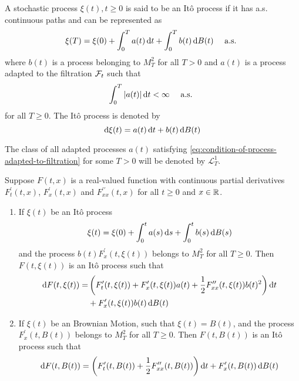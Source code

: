 \begin{definition}
	A stochastic process $\xi(t),t\geq 0$ is said to be an Itô process if it has a.s. continuous paths and can be represented as
	\begin{equation}
		\xi(T)=\xi(0)+\int_{0}^{T}a(t)\mathop{}\!\mathrm{d} t+\int_{0}^{T}b(t)\mathop{}\!\mathrm{d} B(t)\quad\text { a.s. }
	\end{equation}
	where $b(t)$ is a process belonging to $M_{T}^{2}$ for all $T>0$ and $a(t)$ is a process adapted to the filtration ${\mathcal F}_{t}$ such that
	\begin{equation}
		\int_{0}^{T}|a(t)|\mathop{}\!\mathrm{d} t<\infty\quad\text { a.s. } \label{eq:condition-of-process-adapted-to-filtration}
	\end{equation}
	for all $T\geq 0$.
	The Itô process is denoted by
	\begin{equation}
		\mathop{}\!\mathrm{d}\xi(t)=a(t)\mathop{}\!\mathrm{d} t+b(t)\mathop{}\!\mathrm{d} B(t)
	\end{equation}
\end{definition}

\begin{remark}
	The class of all adapted processes $a(t)$ satisfying \ref{eq:condition-of-process-adapted-to-filtration} for some $T>0$ will be denoted by $\mathcal{L}_{T}^{1}$.
\end{remark}

\begin{theorem}[It\^o Formula]
	Suppose $F\left(t,x\right)$ is a real-valued function with continuous partial derivatives $F_{t}^{\prime}\left(t,x\right)$, $F_{x}^{\prime}\left(t,x\right)$ and $F_{xx}^{\prime\prime}\left(t,x\right)$ for all $t\geq 0$ and $x\in{\mathbb R}$.
	\begin{enumerate}
		\item If $\xi(t)$ be an It\^o process
		      \begin{equation*}
			      \xi(t)=\xi(0)+\int_{0}^{t}a(s)\mathop{}\!\mathrm{d} s+\int_{0}^{t}b(s)\mathop{}\!\mathrm{d} B(s)
		      \end{equation*}
		      and the process $b(t)F_{x}^{\prime}(t,\xi(t))$ belongs to $M_{T}^{2}$ for all $T\geq 0$. Then $F(t,\xi(t))$ is an It\^o process such that
		      \begin{equation}
			      \begin{aligned}
				      \mathop{}\!\mathrm{d} F(t,\xi(t))= & \left(F_{t}^{\prime}(t,\xi(t))+F_{x}^{\prime}(t,\xi(t))a(t)+\frac{1}{2}F_{xx}^{\prime\prime}(t,\xi(t))b(t)^{2}\right)\mathop{}\!\mathrm{d} t \\
				                        & +F_{x}^{\prime}(t,\xi(t))b(t)\mathop{}\!\mathrm{d} B(t)
			      \end{aligned}
		      \end{equation}
		\item If $\xi(t)$ be an Brownian Motion, such that $\xi(t)=B(t)$, and the process $F_{x}^{\prime}(t,B(t))$ belongs to $M_{T}^{2}$ for all $T \geq 0$. Then $F(t,B(t))$ is an It\^o process such that
		      \begin{equation}
			      \mathop{}\!\mathrm{d} F(t,B(t))=\left(F_{t}^{\prime}(t,B(t))+\frac{1}{2}F_{xx}^{\prime\prime}(t,B(t))\right)\mathop{}\!\mathrm{d} t+F_{x}^{\prime}(t,B(t))\mathop{}\!\mathrm{d} B(t)
		      \end{equation}
	\end{enumerate}
\end{theorem}

